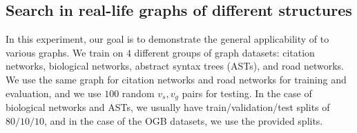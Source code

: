 \subsection{Search in real-life graphs of different structures}
\label{sec:experiments-diversity}

In this experiment, our goal is to demonstrate the general applicability of \phil to various graphs. We train \phil on $4$ different groups of graph datasets: citation networks, biological networks, abstract syntax trees (ASTs), and road networks. We use the same graph for citation networks and road networks for training and evaluation, and we use $100$ random $v_s, v_g$ pairs for testing. In the case of biological networks and ASTs, we usually have train/validation/test splits of $80/10/10$, and in the case of the OGB \cite{hu2020open} datasets, we use the provided splits.


